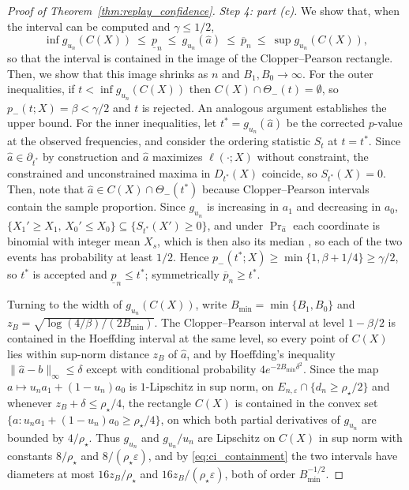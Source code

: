 \documentclass[10pt]{article}
\begin{document}
\begin{proof}[Proof of Theorem~\ref{thm:replay_confidence}]
\emph{Step 4: part (c).}
We show that, when the interval can be computed and $\gamma\le1/2$,
\begin{equation}\label{eq:ci_containment}
\inf g_{u_n}(C(X))\ \le\ \underline p_n\ \le\ g_{u_n}(\widehat a)\ \le\ \overline p_n\ \le\ \sup g_{u_n}(C(X)),
\end{equation}
so that the interval is contained in the image of the Clopper--Pearson rectangle. Then, we show that this image shrinks as $n$ and $B_1, B_0 \to \infty$. For the outer inequalities, if $t<\inf g_{u_n}(C(X))$ then $C(X)\cap\Theta_-(t)=\emptyset$, so $p_-(t;X)=\beta<\gamma/2$ and $t$ is rejected. An analogous argument establishes the upper bound. For the inner inequalities, let $t^*=g_{u_n}(\widehat a)$ be the corrected $p$-value at the observed frequencies, and consider the ordering statistic $S_t$ at $t=t^*$. Since $\widehat a\in\partial_{t^*}$ by construction and $\widehat a$ maximizes $\ell(\cdot;X)$ without constraint, the constrained and unconstrained maxima in $D_{t^*}(X)$ coincide, so $S_{t^*}(X)=0$. Then, note that $\widehat a\in C(X)\cap\Theta_-(t^*)$ because Clopper--Pearson intervals contain the sample proportion. Since $g_{u_n}$ is increasing in $a_1$ and decreasing in $a_0$, $\{X_1'\ge X_1,\,X_0'\le X_0\}\subseteq\{S_{t^*}(X')\ge0\}$, and under $\Pr_{\widehat a}$ each coordinate is binomial with integer mean $X_s$, which is then also its median \citep{kaas1980mean}, so each of the two events has probability at least $1/2$. Hence $p_-(t^*;X)\ge\min\{1,\beta+1/4\}\ge\gamma/2$, so $t^*$ is accepted and $\underline p_n\le t^*$; symmetrically $\overline p_n\ge t^*$.

Turning to the width of $g_{u_n}(C(X))$, write $B_{\min}=\min\{B_1,B_0\}$ and $z_B=\sqrt{\log(4/\beta)/(2B_{\min})}$. The Clopper--Pearson interval at level $1-\beta/2$ is contained in the Hoeffding interval at the same level, so every point of $C(X)$ lies within sup-norm distance $z_B$ of $\widehat a$, and by Hoeffding's inequality $\|\widehat a-b\|_\infty\le\delta$ except with conditional probability $4e^{-2B_{\min}\delta^2}$. Since the map $a\mapsto u_na_1+(1-u_n)a_0$ is $1$-Lipschitz in sup norm, on $E_{n,\varepsilon}\cap\{d_n\ge\rho_\star/2\}$ and whenever $z_B+\delta\le\rho_\star/4$, the rectangle $C(X)$ is contained in the convex set $\{a:u_na_1+(1-u_n)a_0\ge\rho_\star/4\}$, on which both partial derivatives of $g_{u_n}$ are bounded by $4/\rho_\star$. Thus $g_{u_n}$ and $g_{u_n}/u_n$ are Lipschitz on $C(X)$ in sup norm with constants $8/\rho_\star$ and $8/(\rho_\star\varepsilon)$, and by \eqref{eq:ci_containment} the two intervals have diameters at most $16z_B/\rho_\star$ and $16z_B/(\rho_\star\varepsilon)$, both of order $B_{\min}^{-1/2}$.


\end{proof}
\end{document}
